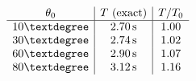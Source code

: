 \documentclass[preview]{standalone}
\begin{document}
\begin{align*}
\special{dvisvgm:raw <g id='unique000'>}
            \begin{array}{c|c|c}
            \theta_0 & T \text{ (exact)} & T/T_0 \\
            \hline
            10°  & 2.70\,\text{s} & 1.00 \\
            30°  & 2.74\,\text{s} & 1.02 \\
            60°  & 2.90\,\text{s} & 1.07 \\
            80°  & 3.12\,\text{s} & 1.16 \\
            \end{array}
            \special{dvisvgm:raw </g>}
\end{align*}
\end{document}
